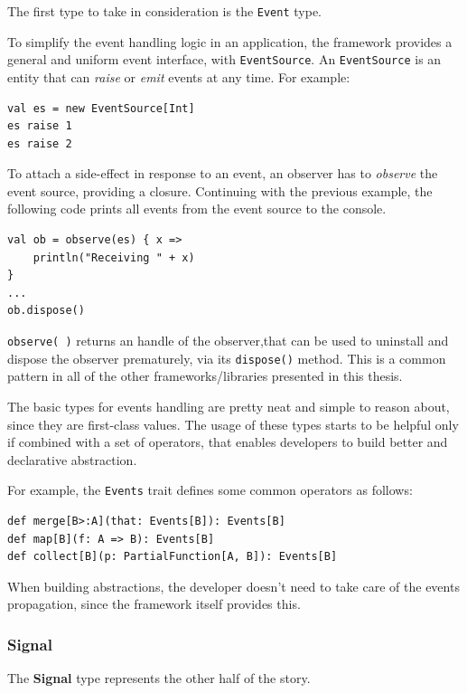 The first type to take in consideration is the \texttt{Event} type.

To simplify the event handling logic in an application, the framework
provides a general and uniform event interface, with
\texttt{EventSource}. An \texttt{EventSource} is an entity that can
\emph{raise} or \emph{emit} events at any time. For example:

\begin{verbatim}
val es = new EventSource[Int]
es raise 1
es raise 2
\end{verbatim}

To attach a side-effect in response to an event, an observer has to
\emph{observe} the event source, providing a closure. Continuing with
the previous example, the following code prints all events from the
event source to the console.

\begin{verbatim}
val ob = observe(es) { x =>
    println("Receiving " + x)
}
...
ob.dispose()
\end{verbatim}

\texttt{observe(\ )} returns an handle of the observer,that can be used
to uninstall and dispose the observer prematurely, via its
\texttt{dispose()} method. This is a common pattern in all of the other
frameworks/libraries presented in this thesis.

The basic types for events handling are pretty neat and simple to reason
about, since they are first-class values. The usage of these types
starts to be helpful only if combined with a set of operators, that
enables developers to build better and declarative abstraction.

For example, the \texttt{Events} trait defines some common operators as
follows:

\begin{verbatim}
def merge[B>:A](that: Events[B]): Events[B]
def map[B](f: A => B): Events[B]
def collect[B](p: PartialFunction[A, B]): Events[B]
\end{verbatim}

When building abstractions, the developer doesn't need to take care of
the events propagation, since the framework itself provides this.

\subsubsection{Signal}\label{signal}

The \textbf{Signal} type represents the other half of the story.

